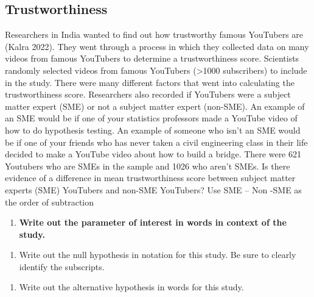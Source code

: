 \documentclass[
]{report}
\providecommand{\tightlist}{%
  \setlength{\itemsep}{0pt}\setlength{\parskip}{0pt}}
\begin{document}
\subsection{Trustworthiness}\label{trustworthiness}

Researchers in India wanted to find out how trustworthy famous YouTubers are (Kalra 2022). They went through a process in which they collected data on many videos from famous YouTubers to determine a trustworthiness score. Scientists randomly selected videos from famous YouTubers (\textgreater1000 subscribers) to include in the study. There were many different factors that went into calculating the trustworthiness score. Researchers also recorded if YouTubers were a subject matter expert (SME) or not a subject matter expert (non-SME). An example of an SME would be if one of your statistics professors made a YouTube video of how to do hypothesis testing. An example of someone who isn't an SME would be if one of your friends who has never taken a civil engineering class in their life decided to make a YouTube video about how to build a bridge. There were 621 Youtubers who are SMEs in the sample and 1026 who aren't SMEs. Is there evidence of a difference in mean trustworthiness score between subject matter experts (SME) YouTubers and non-SME YouTubers? Use SME -- Non -SME as the order of subtraction

\begin{enumerate}
\def\labelenumi{\arabic{enumi}.}
\tightlist
\item
  \textbf{Write out the parameter of interest in words in context of the study.}
\end{enumerate}

\vspace{0.8in}

\begin{enumerate}
\def\labelenumi{\arabic{enumi}.}
\setcounter{enumi}{1}
\tightlist
\item
  Write out the null hypothesis in notation for this study. Be sure to clearly identify the subscripts.
\end{enumerate}

\vspace{0.5in}

\begin{enumerate}
\def\labelenumi{\arabic{enumi}.}
\setcounter{enumi}{2}
\tightlist
\item
  Write out the alternative hypothesis in words for this study.
\end{enumerate}
\end{document}
